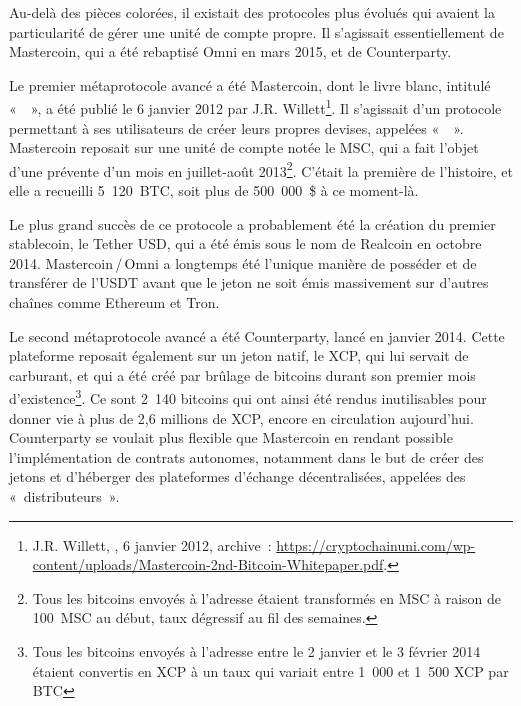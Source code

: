 Au-delà des pièces colorées, il existait des protocoles plus évolués qui avaient la particularité de gérer une unité de compte propre. Il s'agissait essentiellement de Mastercoin, qui a été rebaptisé Omni en mars 2015, et de Counterparty.

Le premier métaprotocole avancé a été Mastercoin, dont le livre blanc, intitulé «~~», a été publié le 6 janvier 2012 par J.R. Willett\footnote{J.R. Willett, , 6 janvier 2012, archive~: \url{https://cryptochainuni.com/wp-content/uploads/Mastercoin-2nd-Bitcoin-Whitepaper.pdf}.}. Il s'agissait d'un protocole permettant à ses utilisateurs de créer leurs propres devises, appelées «~~». Mastercoin reposait sur une unité de compte notée le MSC, qui a fait l'objet d'une prévente d'un mois en juillet-août 2013\footnote{Tous les bitcoins envoyés à l'adresse  étaient transformés en MSC à raison de 100~MSC au début, taux dégressif au fil des semaines. }. C'était la première  de l'histoire, et elle a recueilli 5~120~BTC, soit plus de 500~000~\$ à ce moment-là.

Le plus grand succès de ce protocole a probablement été la création du premier stablecoin, le Tether USD, qui a été émis sous le nom de Realcoin en octobre 2014. Mastercoin\,/\,Omni a longtemps été l'unique manière de posséder et de transférer de l'USDT avant que le jeton ne soit émis massivement sur d'autres chaînes comme Ethereum et Tron.

Le second métaprotocole avancé a été Counterparty, lancé en janvier 2014. Cette plateforme reposait également sur un jeton natif, le XCP, qui lui servait de carburant, et qui a été créé par brûlage de bitcoins durant son premier mois d'existence\footnote{Tous les bitcoins envoyés à l'adresse  entre le 2 janvier et le 3 février 2014 étaient convertis en XCP à un taux qui variait entre 1~000 et 1~500 XCP par BTC}. Ce sont 2~140 bitcoins qui ont ainsi été rendus inutilisables pour donner vie à plus de 2,6 millions de XCP, encore en circulation aujourd'hui. Counterparty se voulait plus flexible que Mastercoin en rendant possible l'implémentation de contrats autonomes, notamment dans le but de créer des jetons et d'héberger des plateformes d'échange décentralisées, appelées des «~distributeurs~».


